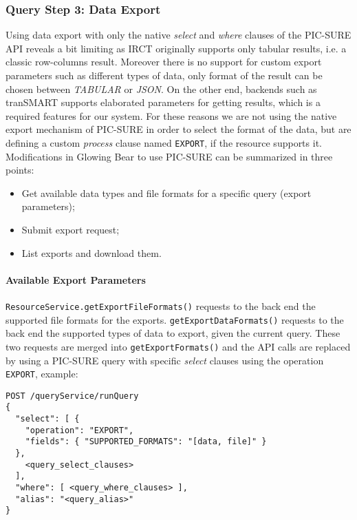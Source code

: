 
\subsubsection{Query Step 3:  Data Export}

Using data export with only the native \emph{select} and \emph{where} clauses of the PIC-SURE API reveals a bit limiting as IRCT originally supports only tabular results, i.e. a classic row-columns result.
Moreover there is no support for custom export parameters such as different types of data, only format of the result can be chosen between \emph{TABULAR} or \emph{JSON}.
On the other end, backends such as tranSMART supports elaborated parameters for getting results, which is a required features for our system.
For these reasons we are not using the native export mechanism of PIC-SURE in order to select the format of the data, but are defining a custom \emph{process} clause named \verb|EXPORT|, if the resource supports it.
Modifications in Glowing Bear to use PIC-SURE can be summarized in three points:
\begin{itemize}
    \item Get available data types and file formats for a specific query (export parameters);
    \item Submit export request;
    \item List exports and download them.
\end{itemize}

\paragraph{Available Export Parameters}

\verb|ResourceService.getExportFileFormats()| requests to the back end the supported file formats for the exports.
\verb|getExportDataFormats()| requests to the back end the supported types of data to export, given the current query.
These two requests are merged into \verb|getExportFormats()| and the API calls are replaced by using a PIC-SURE query with specific \emph{select} clauses using the operation \verb|EXPORT|, example:
\begin{verbatim}
POST /queryService/runQuery
{
  "select": [ {
    "operation": "EXPORT",
    "fields": { "SUPPORTED_FORMATS": "[data, file]" }
  }, 
    <query_select_clauses>
  ],
  "where": [ <query_where_clauses> ],
  "alias": "<query_alias>"
} 
\end{verbatim}

